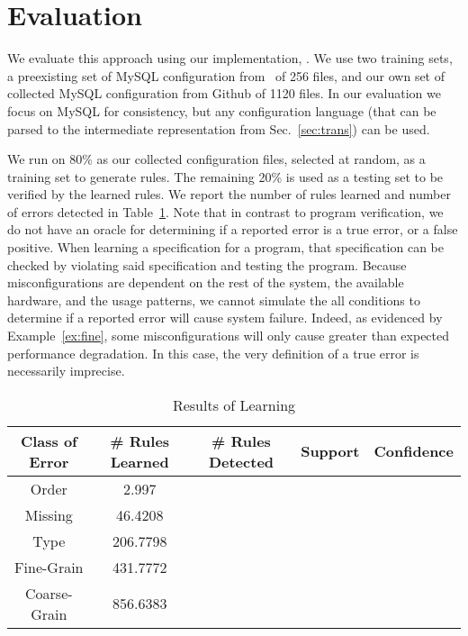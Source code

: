 
\section{Evaluation}

We evaluate this approach using our implementation, \app.
We use two training sets, a preexisting set of MySQL configuration from~\cite{xu15systems} of 256 files,
 and our own set of collected MySQL configuration from Github of 1120 files.
In our evaluation we focus on MySQL for consistency, but any configuration language (that can be parsed to the intermediate representation from Sec.~\ref{sec:trans}) can be used.


We run \app on 80\% as our collected configuration files, selected at random, as a training set to generate rules.
The remaining 20\% is used as a testing set to be verified by the learned rules.
We report the number of rules learned and number of errors detected in Table~\ref{table:learning}.
Note that in contrast to program verification, we do not have an oracle for determining if a reported error is a true error, or a false positive.
When learning a specification for a program, that specification can be checked by violating said specification and testing the program.
Because misconfigurations are dependent on the rest of the system, the available hardware, and the usage patterns, we cannot simulate the all conditions to determine if a reported error will cause system failure.
Indeed, as evidenced by Example~\ref{ex:fine}, some misconfigurations will only cause greater than expected performance degradation.
In this case, the very definition of a true error is necessarily imprecise.

\begin{table}[h]
\centering
\caption{Results of Learning}
\label{table:learning}
\begin{tabular}{|c|c|c|c|c|}
\hline
{\bf Class of Error } & {\bf \# Rules Learned} & {\bf \# Rules Detected} & {\bf Support} & {\bf Confidence}\\ 
\hline
\hline
Order        & 2.997     & &  & \\ 
Missing      & 46.4208   & &  & \\ 
Type         & 206.7798  & &  & \\ 
Fine-Grain   & 431.7772  & &  & \\ 
Coarse-Grain & 856.6383  & &  & \\ 
\hline
\end{tabular}
\end{table}


